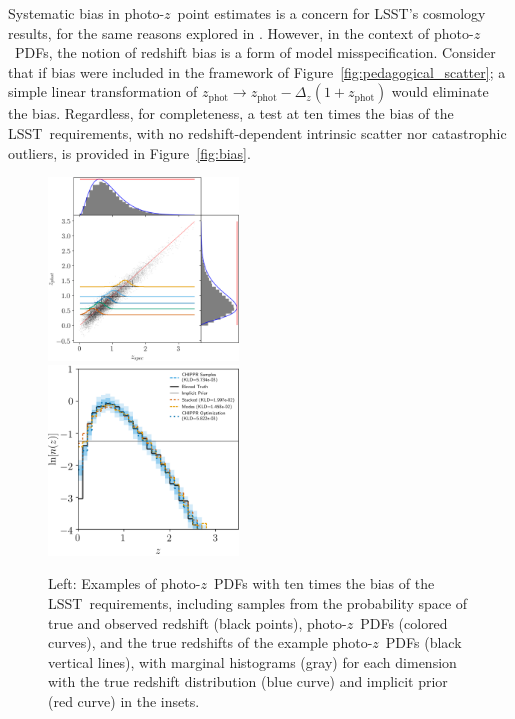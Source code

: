 \documentclass[iop]{emulateapj}
\newcommand{\Fig}[1]{Figure~\ref{#1}}
\newcommand{\project}[1]{\textsc{#1}}
\newcommand{\lsst}{\project{LSST}}
\newcommand{\pz}{photo-$z$}
\newcommand{\pzpdf}{\pz\ PDF}%
\begin{document}
Systematic bias in \pz\ point estimates is a concern for \lsst's cosmology results, for the same reasons explored in \citet{hoyle_dark_2017}.
However, in the context of \pzpdf s, the notion of redshift bias is a form of model misspecification.
Consider that if bias were included in the framework of Figure~\ref{fig:pedagogical_scatter};
a simple linear transformation of $z_{\mathrm{phot}} \to z_{\mathrm{phot}} - \Delta_{z} (1 + z_{\mathrm{phot}})$ would eliminate the bias.
Regardless, for completeness, a test at ten times the bias of the \lsst\ requirements, with no redshift-dependent intrinsic scatter nor catastrophic outliers, is provided in \Fig{fig:bias}.

\begin{figure}
	\begin{center}
	\includegraphics[width=0.45\textwidth]{figures/chippr/thesis_neghivarbias_mega_scatter.png}\\
	\includegraphics[width=0.45\textwidth]{figures/chippr/thesis_neghivarbias_log_estimators.png}
	\caption{
		Left: Examples of \pzpdf s with ten times the bias of the \lsst\ requirements, including samples from the probability space of true and observed redshift (black points), \pzpdf s (colored curves), and the true redshifts of the example \pzpdf s (black vertical lines), with marginal histograms (gray) for each dimension with the true redshift distribution (blue curve) and implicit prior (red curve) in the insets.
}
\end{center}
\end{figure}
\end{document}
